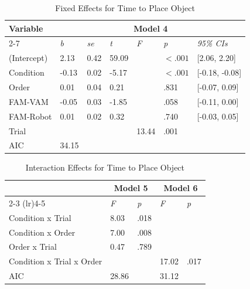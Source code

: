 \documentclass[letterpaper, 10 pt, conference]{ieeeconf}  %
\begin{document}
 \begin{table}[b]
    \centering
    \scriptsize
    \caption{Fixed Effects for Time to Place Object}
    \label{tab:place_fixef}
    \begin{tabular}[width=\columnwidth]{lllllll}
        \toprule
        \multirow{2}{*}{\textbf{Variable}} & \multicolumn{6}{c}{\textbf{Model 4}} \\ \cmidrule(lr){2-7} 
                 & \textit{b} & \textit{se} & \textit{t} & \textit{F} & \textit{p} & \textit{95\% CIs} \\ \midrule
                (Intercept) & 2.13 & 0.42 & 59.09 & & $<.001$ & [2.06, 2.20] \\ 
                  Condition & -0.13 & 0.02 & -5.17 & & $<.001$ & [-0.18, -0.08] \\ 
                  Order & 0.01 & 0.04 & 0.21 & & .831 & [-0.07, 0.09] \\
                  FAM-VAM & -0.05 & 0.03 & -1.85 & & .058 & [-0.11, 0.00]  \\
                  FAM-Robot & 0.01 & 0.02 & 0.32 & & .740 & [-0.03, 0.05]  \\
                  Trial &  &  &  & 13.44 & .001  \\ \midrule
                  AIC & 34.15 & & & & \\ \bottomrule
    \end{tabular}
    \end{table}

\begin{table}[b]
    \centering
    \footnotesize
    \caption{Interaction Effects for Time to Place Object}
    \label{tab:place_interact}
    \begin{tabular}[width=\columnwidth]{lllll}
    \toprule
                          & \multicolumn{2}{c}{\textbf{Model 5}} &  \multicolumn{2}{c}{\textbf{Model 6}}  \\ \cmidrule(lr){2-3} \cmidrule(lr){4-5} 
                          & \textit{F}        & \textit{p} &  \textit{F}       & \textit{p} \\ \midrule
      Condition x Trial   & 8.03 & .018 & & \\
      Condition x Order   &  7.00 & .008   & & \\
      Order x Trial       &  0.47 & .789  & & \\
      Condition x Trial x Order &  &  & 17.02 & .017 \\ \addlinespace \midrule
      AIC                  & 28.86 & & 31.12 & \\ \bottomrule
    \end{tabular}
    \end{table}
\end{document}
